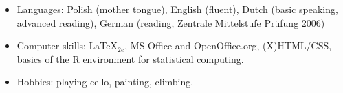 \documentclass[a4paper,12pt]{article}
\begin{document}
\begin{small}
\begin{itemize}
\item Languages: Polish (mother tongue), English (fluent), Dutch
  (basic speaking, advanced reading), German (reading, Zentrale
  Mittelstufe Pr\"ufung 2006)
\item Computer skills: \LaTeX$_{2e}$, MS Office and OpenOffice.org,
  (X)HTML/CSS, basics of the R environment for statistical computing.

\item Hobbies: playing cello, painting, climbing.
\end{itemize}


\end{small}
\end{document}
